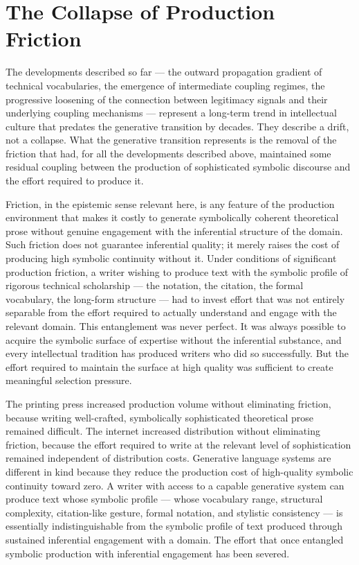 \documentclass[12pt, openright, twoside]{book}
\begin{document}
\section{The Collapse of Production Friction}

The developments described so far --- the outward propagation gradient of
technical vocabularies, the emergence of intermediate coupling regimes, the
progressive loosening of the connection between legitimacy signals and their
underlying coupling mechanisms --- represent a long-term trend in intellectual
culture that predates the generative transition by decades. They describe a
drift, not a collapse. What the generative transition represents is the
removal of the friction that had, for all the developments described above,
maintained some residual coupling between the production of sophisticated
symbolic discourse and the effort required to produce it.

Friction, in the epistemic sense relevant here, is any feature of the
production environment that makes it costly to generate symbolically coherent
theoretical prose without genuine engagement with the inferential structure
of the domain. Such friction does not guarantee inferential quality; it merely
raises the cost of producing high symbolic continuity without it. Under
conditions of significant production friction, a writer wishing to produce
text with the symbolic profile of rigorous technical scholarship --- the
notation, the citation, the formal vocabulary, the long-form structure ---
had to invest effort that was not entirely separable from the effort required
to actually understand and engage with the relevant domain. This entanglement
was never perfect. It was always possible to acquire the symbolic surface
of expertise without the inferential substance, and every intellectual
tradition has produced writers who did so successfully. But the effort required
to maintain the surface at high quality was sufficient to create meaningful
selection pressure.

The printing press increased production volume without eliminating friction,
because writing well-crafted, symbolically sophisticated theoretical prose
remained difficult. The internet increased distribution without eliminating
friction, because the effort required to write at the relevant level of
sophistication remained independent of distribution costs. Generative language
systems are different in kind because they reduce the production cost of
high-quality symbolic continuity toward zero. A writer with access to a
capable generative system can produce text whose symbolic profile ---
whose vocabulary range, structural complexity, citation-like gesture,
formal notation, and stylistic consistency --- is essentially indistinguishable
from the symbolic profile of text produced through sustained inferential
engagement with a domain. The effort that once entangled symbolic production
with inferential engagement has been severed.
\end{document}
